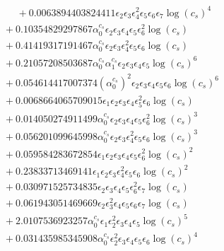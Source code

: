 \documentclass[10pt]{article}
\begin{document}
\begin{align*}
\phantom{F_{s,7}} &\phantom{={}}{}  + 0.0063894403824411 \epsilon_{2} \epsilon_{3} \epsilon_{4}^{2} \epsilon_{5} \epsilon_{6} \epsilon_{7} \log{\left(c_{s} \right)}^{4} \\
&{}  + 0.10354829297867 \alpha_{0}^{c_s} \epsilon_{2} \epsilon_{3} \epsilon_{4} \epsilon_{5} \epsilon_{6}^{2} \log{\left(c_{s} \right)} \\
&{}  + 0.41419317191467 \alpha_{0}^{c_s} \epsilon_{2} \epsilon_{3} \epsilon_{4}^{2} \epsilon_{5} \epsilon_{6} \log{\left(c_{s} \right)} \\
&{}  + 0.21057208503687 \alpha_{0}^{c_s} \alpha_{1}^{c_s} \epsilon_{2} \epsilon_{3} \epsilon_{4} \epsilon_{5} \log{\left(c_{s} \right)}^{6} \\
&{}  + 0.054614417007374 \left(\alpha_{0}^{c_s}\right)^{2} \epsilon_{2} \epsilon_{3} \epsilon_{4} \epsilon_{5} \epsilon_{6} \log{\left(c_{s} \right)}^{6} \\
&{}  + 0.0068664065709015 \epsilon_{1} \epsilon_{2} \epsilon_{3} \epsilon_{4} \epsilon_{5}^{2} \epsilon_{6} \log{\left(c_{s} \right)} \\
&{}  + 0.014050274911499 \alpha_{0}^{c_s} \epsilon_{2} \epsilon_{3} \epsilon_{4} \epsilon_{5} \epsilon_{6}^{2} \log{\left(c_{s} \right)}^{3} \\
&{}  + 0.056201099645998 \alpha_{0}^{c_s} \epsilon_{2} \epsilon_{3} \epsilon_{4}^{2} \epsilon_{5} \epsilon_{6} \log{\left(c_{s} \right)}^{3} \\
&{}  + 0.059584283672854 \epsilon_{1} \epsilon_{2} \epsilon_{3} \epsilon_{4} \epsilon_{5} \epsilon_{6}^{2} \log{\left(c_{s} \right)}^{2} \\
&{}  + 0.23833713469141 \epsilon_{1} \epsilon_{2} \epsilon_{3} \epsilon_{4}^{2} \epsilon_{5} \epsilon_{6} \log{\left(c_{s} \right)}^{2} \\
&{}  + 0.030971525734835 \epsilon_{2} \epsilon_{3} \epsilon_{4} \epsilon_{5} \epsilon_{6}^{2} \epsilon_{7} \log{\left(c_{s} \right)} \\
&{}  + 0.061943051469669 \epsilon_{2} \epsilon_{3}^{2} \epsilon_{4} \epsilon_{5} \epsilon_{6} \epsilon_{7} \log{\left(c_{s} \right)} \\
&{}  + 2.0107536923257 \alpha_{0}^{c_s} \epsilon_{1} \epsilon_{2}^{2} \epsilon_{3} \epsilon_{4} \epsilon_{5} \log{\left(c_{s} \right)}^{5} \\
&{}  + 0.031435985345908 \alpha_{0}^{c_s} \epsilon_{2}^{2} \epsilon_{3} \epsilon_{4} \epsilon_{5} \epsilon_{6} \log{\left(c_{s} \right)}^{4} \\

\end{align*}
\end{document}
